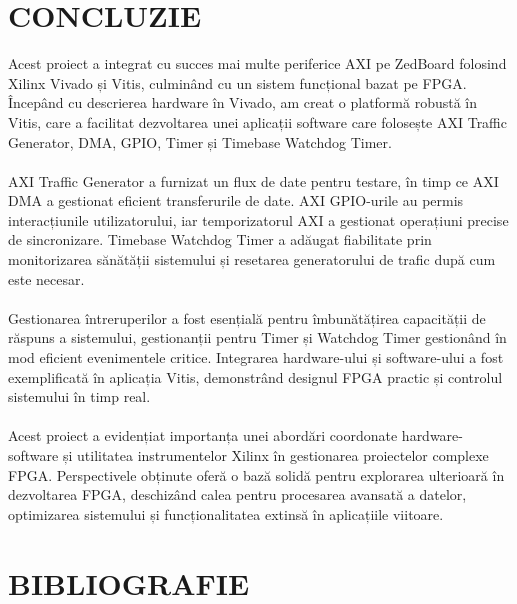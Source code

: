 \documentclass[12pt]{article}
\begin{document}
\newpage
\section{\uppercase{Concluzie}}
\hspace*{1cm}Acest proiect a integrat cu succes mai multe periferice AXI pe ZedBoard folosind Xilinx Vivado și Vitis, culminând cu un sistem funcțional bazat pe FPGA. Începând cu descrierea hardware în Vivado, am creat o platformă robustă în Vitis, care a facilitat dezvoltarea unei aplicații software care folosește AXI Traffic Generator, DMA, GPIO, Timer și Timebase Watchdog Timer.\\\\
\hspace*{1cm}AXI Traffic Generator a furnizat un flux de date pentru testare, în timp ce AXI DMA a gestionat eficient transferurile de date. AXI GPIO-urile au permis interacțiunile utilizatorului, iar temporizatorul AXI a gestionat operațiuni precise de sincronizare. Timebase Watchdog Timer a adăugat fiabilitate prin monitorizarea sănătății sistemului și resetarea generatorului de trafic după cum este necesar.\\\\
\hspace*{1cm}Gestionarea întreruperilor a fost esențială pentru îmbunătățirea capacității de răspuns a sistemului, gestionanții pentru Timer și Watchdog Timer gestionând în mod eficient evenimentele critice. Integrarea hardware-ului și software-ului a fost exemplificată în aplicația Vitis, demonstrând designul FPGA practic și controlul sistemului în timp real.\\\\
\hspace*{1cm}Acest proiect a evidențiat importanța unei abordări coordonate hardware-software și utilitatea instrumentelor Xilinx în gestionarea proiectelor complexe FPGA. Perspectivele obținute oferă o bază solidă pentru explorarea ulterioară în dezvoltarea FPGA, deschizând calea pentru procesarea avansată a datelor, optimizarea sistemului și funcționalitatea extinsă în aplicațiile viitoare.



\newpage
\section{\uppercase{Bibliografie}}
\end{document}
